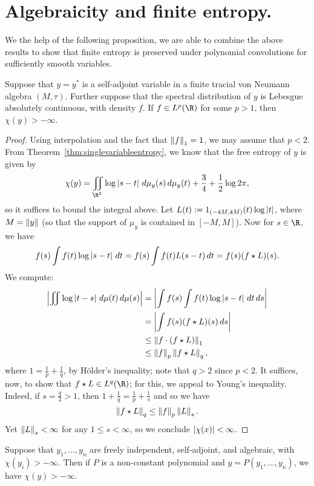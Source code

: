 \section{Algebraicity and finite entropy.}
We the help of the following proposition, we are able to combine the above results to show that finite entropy is preserved under polynomial convolutions for sufficiently smooth variables.


\begin{proposition}
	\label{prop:lpentropy}
	Suppose that $y = y^*$ is a self-adjoint variable in a finite tracial von Neumann algebra $(M, \tau)$.
	Further suppose that the spectral distribution of $y$ is Lebesgue absolutely continuous, with density $f$.
	If $f \in L^p(\R)$ for some $p > 1$, then $\chi(y) > -\infty$.
\end{proposition}
\begin{proof}
	Using interpolation and the fact that $\left\|f\right\|_1 = 1$, we may assume that $p < 2$.
	From Theorem~\ref{thm:singlevariableentropy}, we know that the free entropy of $y$ is given by
	$$\chi(y) = \iint_{\R^2}\log\abs{s-t} \,d\mu_y(s)\,d\mu_y(t) + \frac34 + \frac12\log2\pi,$$
	so it suffices to bound the integral above.
	Let $L(t) := 1_{(-4M, 4M)}(t)\log\left|t\right|$, where $M = \left\|y\right\|$ (so that the support of $\mu_y$ is contained in $[-M, M]$).
	Now for $s \in \R$, we have
	$$f(s) \int f(t) \log\left|s-t\right|\,dt = f(s)\int f(t)L(s-t)\,dt = f(s)(f\star L)(s).$$
	We compute:
	\begin{align*}
		\left|\iint \log\left|t-s\right|\,d\mu(t)\,d\mu(s)\right|
		&= \left|\int f(s) \int f(t)\log\left|s-t\right|\,dt\,ds\right|\\
		&= \left|\int f(s)(f\star L)(s)\,ds\right|\\
		&\leq \left\|f\cdot(f\star L)\right\|_1\\
		&\leq \left\|f\right\|_p\left\|f\star L\right\|_q,
	\end{align*}
	where $1 = \frac1p+\frac1q$, by H\"older's inequality; note that $q > 2$ since $p < 2$.
	It suffices, now, to show that $f\star L \in L^q(\R)$; for this, we appeal to Young's inequality.
	Indeed, if $s = \frac q2 > 1$, then $1 + \frac 1q = \frac1p+\frac1s$ and so we have
	$$\left\|f \star L\right\|_q \leq \left\|f\right\|_p\left\|L\right\|_s.$$
	Yet $\left\|L\right\|_s < \infty$ for any $1 \leq s < \infty$, so we conclude $\left|\chi(x)\right| < \infty$.
\end{proof}


\begin{corollary}
	Suppose that $y_1, \ldots, y_n$ are freely independent, self-adjoint, and algebraic, with $\chi(y_i) > -\infty$.
	Then if $P$ is a non-constant polynomial and $y = P(y_1, \ldots, y_n)$, we have $\chi(y) > -\infty$.
\end{corollary}

